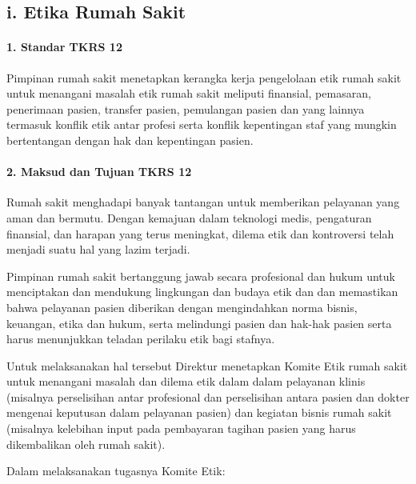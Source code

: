 \documentclass[
]{book}
\begin{document}
\hypertarget{i.-etika-rumah-sakit}{%
\subsection*{i. Etika Rumah Sakit}\label{i.-etika-rumah-sakit}}

\hypertarget{standar-tkrs-12}{%
\paragraph*{1. Standar TKRS 12}\label{standar-tkrs-12}}

Pimpinan rumah sakit menetapkan kerangka kerja pengelolaan etik rumah sakit untuk menangani masalah etik rumah sakit meliputi finansial, pemasaran, penerimaan pasien, transfer pasien, pemulangan pasien dan yang lainnya termasuk konflik etik antar profesi serta konflik kepentingan staf yang mungkin bertentangan dengan hak dan kepentingan pasien.

\hypertarget{maksud-dan-tujuan-tkrs-12}{%
\paragraph*{2. Maksud dan Tujuan TKRS 12}\label{maksud-dan-tujuan-tkrs-12}}

Rumah sakit menghadapi banyak tantangan untuk memberikan pelayanan yang aman dan bermutu. Dengan kemajuan dalam teknologi medis, pengaturan finansial, dan harapan yang terus meningkat, dilema etik dan kontroversi telah menjadi suatu hal yang lazim terjadi.

Pimpinan rumah sakit bertanggung jawab secara profesional dan hukum untuk menciptakan dan mendukung lingkungan dan budaya etik dan dan memastikan bahwa pelayanan pasien diberikan dengan mengindahkan norma bisnis, keuangan, etika dan hukum, serta melindungi pasien dan hak-hak pasien serta harus menunjukkan teladan perilaku etik bagi stafnya.

Untuk melaksanakan hal tersebut Direktur menetapkan Komite Etik rumah sakit untuk menangani masalah dan dilema etik dalam dalam pelayanan klinis (misalnya perselisihan antar profesional dan perselisihan antara pasien dan dokter mengenai keputusan dalam pelayanan pasien) dan kegiatan bisnis rumah sakit (misalnya kelebihan input pada pembayaran tagihan pasien yang harus dikembalikan oleh rumah sakit).

Dalam melaksanakan tugasnya Komite Etik:
\end{document}
